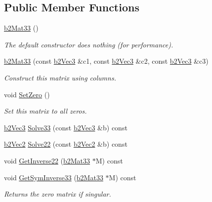 \subsection*{Public Member Functions}
\begin{DoxyCompactItemize}
\item 
\mbox{\label{structb2Mat33_a1f4d7ddf1c8a202fc08ec64dfe191463}} 
\hyperlink{structb2Mat33_a1f4d7ddf1c8a202fc08ec64dfe191463}{b2\+Mat33} ()
\begin{DoxyCompactList}\small\item\em The default constructor does nothing (for performance). \end{DoxyCompactList}\item 
\mbox{\label{structb2Mat33_a36d99a037008776c8d09fe0aeb5c759c}} 
\hyperlink{structb2Mat33_a36d99a037008776c8d09fe0aeb5c759c}{b2\+Mat33} (const \hyperlink{structb2Vec3}{b2\+Vec3} \&c1, const \hyperlink{structb2Vec3}{b2\+Vec3} \&c2, const \hyperlink{structb2Vec3}{b2\+Vec3} \&c3)
\begin{DoxyCompactList}\small\item\em Construct this matrix using columns. \end{DoxyCompactList}\item 
\mbox{\label{structb2Mat33_a42fc6953b025e1c8b59717d0ee7accde}} 
void \hyperlink{structb2Mat33_a42fc6953b025e1c8b59717d0ee7accde}{Set\+Zero} ()
\begin{DoxyCompactList}\small\item\em Set this matrix to all zeros. \end{DoxyCompactList}\item 
\hyperlink{structb2Vec3}{b2\+Vec3} \hyperlink{structb2Mat33_a2ce48f409ba5951a04da821dada9e285}{Solve33} (const \hyperlink{structb2Vec3}{b2\+Vec3} \&b) const
\item 
\hyperlink{structb2Vec2}{b2\+Vec2} \hyperlink{structb2Mat33_acdf892aab7e26283f8aa600ade91dcef}{Solve22} (const \hyperlink{structb2Vec2}{b2\+Vec2} \&b) const
\item 
void \hyperlink{structb2Mat33_aa020bfd08e28c4cecda303ba335fe517}{Get\+Inverse22} (\hyperlink{structb2Mat33}{b2\+Mat33} $\ast$M) const
\item 
void \hyperlink{structb2Mat33_a2620944663233096d3b82bc4b1a991e9}{Get\+Sym\+Inverse33} (\hyperlink{structb2Mat33}{b2\+Mat33} $\ast$M) const
\begin{DoxyCompactList}\small\item\em Returns the zero matrix if singular. \end{DoxyCompactList}\item 

\end{DoxyCompactItemize}
